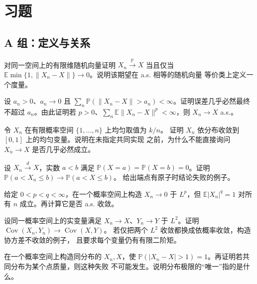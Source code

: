 \section*{习题}
\subsection*{A 组：定义与关系}
\begin{enumerate}[label=\textbf{\thechapter.\arabic*.}]
对同一空间上的有限维随机向量证明
$X_n\xrightarrow{\mathbb P}X$ 当且仅当
$\mathbb E\min\{1,\|X_n-X\|\}\to0$。说明该期望在 a.s. 相等的随机向量
等价类上定义一个度量。

设 $a_n>0$、$a_n\to0$ 且
$\sum_n\mathbb P(\|X_n-X\|>a_n)<\infty$。证明误差几乎必然最终不超过
$a_n$。由此证明若 $p>0$、$\sum_n\mathbb E\|X_n-X\|^p<\infty$，则
$X_n\to X$ a.s.。

令 $X_n$ 在有限概率空间 $\{1,\ldots,n\}$ 上均匀取值为 $k/n$。
证明 $X_n$ 依分布收敛到 $[0,1]$ 上的均匀变量。说明在未指定共同实现
之前，为什么不能直接询问 $X_n\to X$ 是否几乎必然成立。

设 $X_n\xrightarrow dX$，实数 $a<b$ 满足
$\mathbb P(X=a)=\mathbb P(X=b)=0$。证明
$\mathbb P(a<X_n\le b)\to\mathbb P(a<X\le b)$。
给出端点有原子时结论失败的例子。

给定 $0<p<q<\infty$，在一个概率空间上构造 $X_n\to0$ 于 $L^p$，但
$\mathbb E|X_n|^q=1$ 对所有 $n$ 成立。再计算它是否 a.s. 收敛。

设同一概率空间上的实变量满足 $X_n\to X$、$Y_n\to Y$ 于 $L^2$。证明
$\operatorname{Cov}(X_n,Y_n)\to\operatorname{Cov}(X,Y)$。
若仅把两个 $L^2$ 收敛都换成依概率收敛，构造协方差不收敛的例子，
且要求每个变量仍有有限二阶矩。

在一个概率空间上构造同分布的 $X_n,X$，使
$\mathbb P(|X_n-X|>1)=1$。再证明若共同分布为某个点质量，则这种失败
不可能发生。说明分布极限的“唯一”指的是什么。
\end{enumerate}


